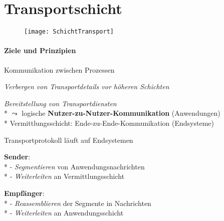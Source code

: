 \section{Transportschicht}
\begin{figure}[H]\centering\texttt{[image: SchichtTransport]}\end{figure}

\paragraph{Ziele und Prinzipien}
\begin{items}
	\item Kommunikation zwischen Prozessen
  \item \emph{Verbergen von Transportdetails vor höheren Schichten}
  \item \emph{Bereitstellung von Transportdiensten} \\*
    \( \leadsto \) logische \textbf{Nutzer-zu-Nutzer-Kommunikation} (Anwendungen)\\*
    Vermittlungsschicht: Ende-zu-Ende-Kommunikation (Endsysteme)
    \medskip
  \item Transportprotokoll läuft auf Endsystemen
  \item \textbf{Sender}: \\*
    - \emph{Segmentieren} von Anwendungsnachrichten \\*
    - \emph{Weiterleiten} an Vermittlungsschicht
  \item \textbf{Empfänger}: \\*
    - \emph{Reassemblieren} der Segmente in Nachrichten \\*
    - \emph{Weiterleiten} an Anwendungsschicht
\end{items}

